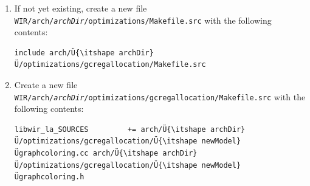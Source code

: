 \begin{enumerate}
\begin{lstlisting}[style=code,float=!t,caption={Rudimentary Implementation of a New Processor Model's Graph Coloring-Based Register Allocator},label=lst:newprocgcraimpl]
^ifdef HAVE_CONFIG_H^
^#include^ §<config_wir.h>§
^#endif^

^#include^ §<libuseful/io.h>§

// Include WIR headers
^#include^ §<wir/wir.h>§
^#include^ §<arch/Ü{\itshape\color{orange}archDir}Ü/Ü{\itshape\color{orange}newModel}Ü.h>§

// Include local headers
^#include^ §"Ü{\itshape\color{orange}newModel}Ügraphcoloring.h"§

namespace WIR {

// Default constructor for system-level optimization.
Ü{\itshape newModel}Ü_GraphColoring::Ü{\itshape newModel}Ü_GraphColoring@(@ WIR_System æ&æs, @bool@ verbosity @) :@Ü\label{lst:newprocgcraimpl1}Ü
  WIR_Optimization { s },
  WIR_GraphColoring { s, verbosity }
{};

// Default constructor for compilation unit-level optimization.
Ü{\itshape newModel}Ü_GraphColoring::Ü{\itshape newModel}Ü_GraphColoring@(@ WIR_CompilationUnit æ&æc, @bool@ verbosity @) :@Ü\label{lst:newprocgcraimpl2}Ü
  WIR_Optimization { c },
  WIR_GraphColoring { c, verbosity }
{};

// Default constructor for function-level optimization.
Ü{\itshape newModel}Ü_GraphColoring::Ü{\itshape newModel}Ü_GraphColoring@(@ WIR_Function æ&æf, @bool@ verbosity @) :@Ü\label{lst:newprocgcraimpl3}Ü
  WIR_Optimization { f },
  WIR_GraphColoring { f, verbosity }
{};

// Destructor.
Ü{\itshape newModel}Ü_GraphColoring::~Ü{\itshape newModel}Ü_GraphColoring@( void )@Ü\label{lst:newprocgcraimpl4}Ü
{};

}       // namespace WIR
\end{lstlisting}

  \item If not yet existing, create a new file \texttt{WIR/arch/{\itshape archDir}/optimizations/Makefile.src} with the following contents: \\
\begin{lstlisting}[style=code,float=h,xleftmargin=10mm,aboveskip=-0.8 \baselineskip,belowskip=-0.8 \baselineskip]
include arch/Ü{\itshape archDir}Ü/optimizations/gcregallocation/Makefile.src
\end{lstlisting}

  \item Create a new file \texttt{WIR/arch/{\itshape archDir}/optimizations/gcregallocation/Makefile.src} with the following contents: \\
\begin{lstlisting}[style=code,float=!ht,xleftmargin=10mm,aboveskip=-0.8 \baselineskip,belowskip=-0.8 \baselineskip]
libwir_la_SOURCES         += arch/Ü{\itshape archDir}Ü/optimizations/gcregallocation/Ü{\itshape newModel}Ügraphcoloring.cc arch/Ü{\itshape archDir}Ü/optimizations/gcregallocation/Ü{\itshape newModel}Ügraphcoloring.h


\end{lstlisting}
\end{enumerate}
